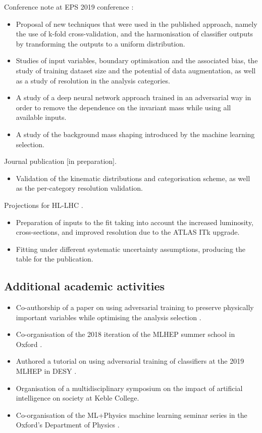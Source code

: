 \begin{originality}
\noindent Conference note at EPS 2019 conference \cite{ATLAS-CONF-2019-028}:
\begin{itemize}
\item Proposal of new techniques that were used in the
published approach, namely the use of k-fold cross-validation,
and the harmonisation of classifier outputs by transforming the
outputs to a uniform distribution.
\item Studies of input variables, boundary optimisation and the
associated bias, the study of training dataset size and the potential
of data augmentation, as well as a study of resolution in
the analysis categories.
\item A study of a deep neural network approach trained in an
adversarial way in order to remove the dependence on the invariant
mass while using all available inputs.
\item A study of the background mass shaping introduced by the
machine learning selection.
\end{itemize}

\noindent Journal publication [in preparation].
\begin{itemize}
\item Validation of the kinematic distributions and categorisation
scheme, as well as the per-category resolution validation.
\end{itemize}

\noindent Projections for HL-LHC \cite{ATL-PHYS-PUB-2018-054, Cepeda:2019klc}.
\begin{itemize}
\item Preparation of inputs to the fit taking into account the increased
luminosity, cross-sections, and improved resolution due to the ATLAS
ITk upgrade.
\item Fitting under different systematic uncertainty assumptions,
producing the table for the publication.
\end{itemize}

\subsection*{Additional academic activities}

\begin{itemize}
\item Co-authorship of a paper on using adversarial training to preserve
physically important variables while optimising the analysis
selection \cite{Windischhofer:2019ltt}.
\item Co-organisation of the 2018 iteration of the MLHEP summer school
in Oxford \cite{MLHEP2018}.
\item Authored a tutorial on using adversarial training of classifiers
at the 2019 MLHEP in DESY \cite{MLHEP2019}.
\item Organisation of a multidisciplinary symposium on the impact of artificial
intelligence on society at Keble College.
\item Co-organisation of the ML+Physics machine learning seminar
series in the Oxford's Department of Physics \cite{ML+physics}.
\end{itemize}
\end{originality}






